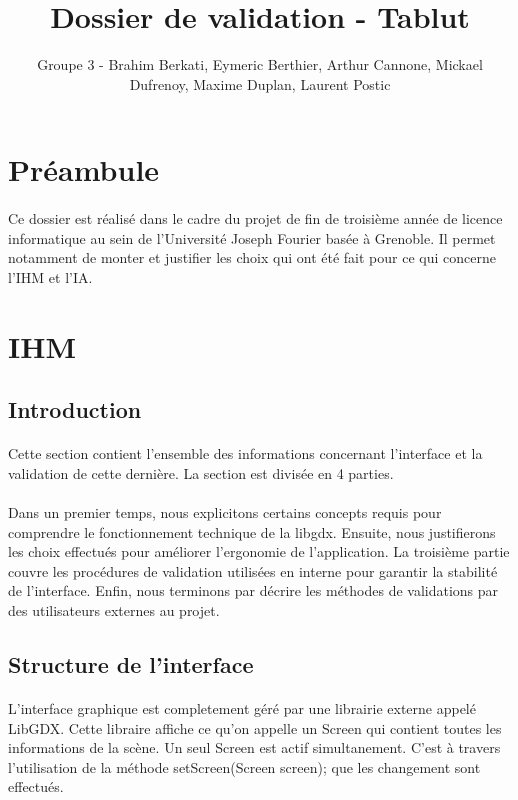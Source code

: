 \documentclass[11pt]{article} %
\title{Dossier de validation - Tablut}
\author{Groupe 3 - Brahim Berkati, Eymeric Berthier, Arthur Cannone, Mickael Dufrenoy, Maxime Duplan, Laurent Postic}
\begin{document}
\maketitle

\section{Préambule}
\paragraph{}
Ce dossier est réalisé dans le cadre du projet de fin de troisième année de licence informatique au sein de l'Université Joseph Fourier basée à Grenoble. Il permet notamment de monter et justifier les choix qui ont été fait pour ce qui concerne l'IHM et l'IA.

\section{IHM}

\subsection{Introduction}
\paragraph{}
Cette section contient l'ensemble des informations concernant l'interface et la validation de cette dernière. La section est divisée en 4 parties.
\paragraph{}
Dans un premier temps, nous explicitons certains concepts requis pour comprendre le fonctionnement technique de la libgdx. Ensuite, nous justifierons les choix effectués pour améliorer l'ergonomie de l'application. La troisième partie couvre les procédures de validation utilisées en interne pour garantir la stabilité de l'interface. Enfin, nous terminons par décrire les méthodes de validations par des utilisateurs externes au projet.


\subsection{Structure de l'interface}
\paragraph{}
L'interface graphique est completement géré par une librairie externe appelé LibGDX. Cette libraire affiche ce qu'on appelle un Screen qui contient toutes les informations de la scène. Un seul Screen est actif simultanement. C'est à travers l'utilisation de la méthode setScreen(Screen screen); que les changement sont effectués.
\end{document}
